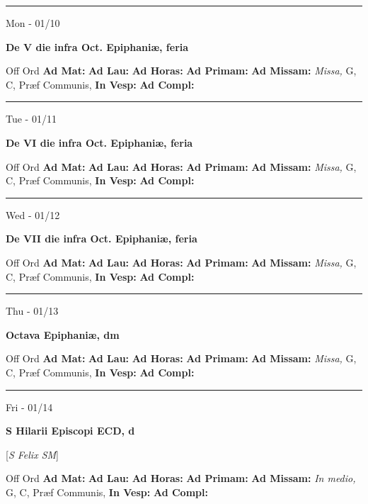 \documentclass[letterpaper, 10pt]{article}
\begin{document}
\hrule
\begin{center}
Mon - 01/10
\end{center}\textbf{ \large De V die infra Oct. Epiphaniæ, \textnormal{\normalsize feria}}
\begin{justify}
Off Ord
\textbf{Ad Mat: }
\textbf{Ad Lau: }
\textbf{Ad Horas: }
\textbf{Ad Primam: }
\textbf{Ad Missam:} \textit{Missa, } G, C, Præf Communis, 
\textbf{In Vesp: }
\textbf{Ad Compl: }\end{justify}



\hrule
\begin{center}
Tue - 01/11
\end{center}\textbf{ \large De VI die infra Oct. Epiphaniæ, \textnormal{\normalsize feria}}
\begin{justify}
Off Ord
\textbf{Ad Mat: }
\textbf{Ad Lau: }
\textbf{Ad Horas: }
\textbf{Ad Primam: }
\textbf{Ad Missam:} \textit{Missa, } G, C, Præf Communis, 
\textbf{In Vesp: }
\textbf{Ad Compl: }\end{justify}



\hrule
\begin{center}
Wed - 01/12
\end{center}\textbf{ \large De VII die infra Oct. Epiphaniæ, \textnormal{\normalsize feria}}
\begin{justify}
Off Ord
\textbf{Ad Mat: }
\textbf{Ad Lau: }
\textbf{Ad Horas: }
\textbf{Ad Primam: }
\textbf{Ad Missam:} \textit{Missa, } G, C, Præf Communis, 
\textbf{In Vesp: }
\textbf{Ad Compl: }\end{justify}



\hrule
\begin{center}
Thu - 01/13
\end{center}\textbf{ \large Octava Epiphaniæ, \textnormal{\normalsize dm}}
\begin{justify}
Off Ord
\textbf{Ad Mat: }
\textbf{Ad Lau: }
\textbf{Ad Horas: }
\textbf{Ad Primam: }
\textbf{Ad Missam:} \textit{Missa, } G, C, Præf Communis, 
\textbf{In Vesp: }
\textbf{Ad Compl: }\end{justify}



\hrule
\begin{center}
Fri - 01/14
\end{center}\textbf{ \large S Hilarii Episcopi ECD, \textnormal{\normalsize d}}

[\textit{S Felix SM}]
\begin{justify}
Off Ord
\textbf{Ad Mat: }
\textbf{Ad Lau: }
\textbf{Ad Horas: }
\textbf{Ad Primam: }
\textbf{Ad Missam:} \textit{In medio, } G, C, Præf Communis, 
\textbf{In Vesp: }
\textbf{Ad Compl: }\end{justify}
\end{document}
